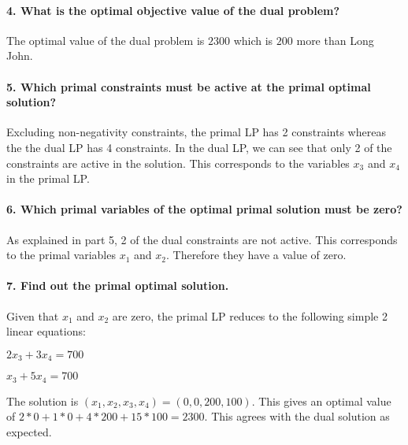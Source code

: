 \documentclass[11pt]{article}
\begin{document}
    \hypertarget{what-is-the-optimal-objective-value-of-the-dual-problem}{%
\paragraph{4. What is the optimal objective value of the dual
problem?}\label{what-is-the-optimal-objective-value-of-the-dual-problem}}

The optimal value of the dual problem is \(2300\) which is \(200\) more
than Long John.

    \hypertarget{which-primal-constraints-must-be-active-at-the-primal-optimal-solution}{%
\paragraph{5. Which primal constraints must be active at the primal
optimal
solution?}\label{which-primal-constraints-must-be-active-at-the-primal-optimal-solution}}

Excluding non-negativity constraints, the primal LP has 2 constraints
whereas the the dual LP has 4 constraints. In the dual LP, we can see
that only 2 of the constraints are active in the solution. This
corresponds to the variables \(x_3\) and \(x_4\) in the primal LP.

    \hypertarget{which-primal-variables-of-the-optimal-primal-solution-must-be-zero}{%
\paragraph{6. Which primal variables of the optimal primal solution must
be
zero?}\label{which-primal-variables-of-the-optimal-primal-solution-must-be-zero}}

As explained in part 5, 2 of the dual constraints are not active. This
corresponds to the primal variables \(x_1\) and \(x_2\). Therefore they
have a value of zero.

    \hypertarget{find-out-the-primal-optimal-solution.}{%
\paragraph{7. Find out the primal optimal
solution.}\label{find-out-the-primal-optimal-solution.}}

Given that \(x_1\) and \(x_2\) are zero, the primal LP reduces to the
following simple 2 linear equations:

\(2x_3 + 3x_4 = 700\)

\(x_3 + 5x_4 = 700\)

The solution is \((x_1, x_2, x_3, x_4) = (0, 0, 200, 100)\). This gives
an optimal value of \(2*0 + 1*0 + 4*200 + 15*100 = 2300\). This agrees
with the dual solution as expected.
\end{document}
